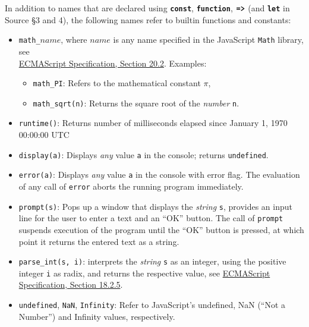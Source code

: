 In addition to names that
are declared using \texttt{\textbf{const}}, \texttt{\textbf{function}},
$\texttt{\textbf{=>}}$ (and \texttt{\textbf{let}} in Source \S3 and 4), the following
names refer to builtin functions and constants:
\begin{itemize}
\item \lstinline{math_}$\textit{name}$,
where $\textit{name}$ is any name specified in the
JavaScript
\texttt{Math} library, see\\
\href{https://www.ecma-international.org/ecma-262/8.0/index.html#sec-math-object}{\color{DarkBlue}ECMAScript Specification, Section 20.2}. Examples:
\begin{itemize}
\item \verb#math_PI#: Refers to the mathematical constant $\pi$,
\item \verb#math_sqrt#\texttt{(n)}: Returns the square root of the \emph{number} \texttt{n}.
\end{itemize}
\item \texttt{runtime()}: Returns number of milliseconds elapsed since January 1, 1970 00:00:00 UTC
\item \texttt{display(a)}: Displays \emph{any} value \texttt{a} in the console; returns \texttt{undefined}.
\item \texttt{error(a)}: Displays \emph{any} value \texttt{a} in the console with error flag. The evaluation
  of any call of \texttt{error} aborts the running program immediately.
\item \texttt{prompt(s)}: Pops up a window that displays the \emph{string} \texttt{s}, provides
an input line for the user to enter a text and an ``OK'' button. The call of \texttt{prompt}
suspends execution of the program until the ``OK'' button is pressed, at which point it
returns the entered text as a string.
\item \verb#parse_int#\texttt{(s, i)}:
interprets the \emph{string} \texttt{s} as an integer, using the positive integer \texttt{i} as radix, and returns the respective value,
see \href{https://www.ecma-international.org/ecma-262/8.0/index.html#sec-parseint-string-radix}{\color{DarkBlue}ECMAScript Specification, Section 18.2.5}.
\item \verb#undefined#, \verb#NaN#, \verb#Infinity#: Refer to JavaScript's undefined,
NaN (``Not a Number'') and Infinity values, respectively.
\end{itemize}
